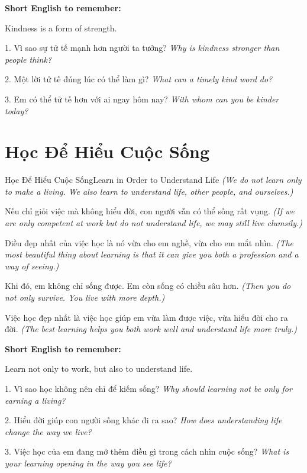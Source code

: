 \begin{ghinhoanh}
\textbf{Short English to remember:}

Kindness is a form of strength.

\end{ghinhoanh}

\begin{tuhocnhanh}
1. Vì sao sự tử tế mạnh hơn người ta tưởng? \textit{Why is kindness stronger than people think?}

2. Một lời tử tế đúng lúc có thể làm gì? \textit{What can a timely kind word do?}

3. Em có thể tử tế hơn với ai ngay hôm nay? \textit{With whom can you be kinder today?}
\end{tuhocnhanh}
\ngancach

\section{Học Để Hiểu Cuộc Sống}
\begin{truyen}{Học Để Hiểu Cuộc Sống}{Learn in Order to Understand Life}
\textit{(We do not learn only to make a living. We also learn to understand life, other people, and ourselves.)}

Nếu chỉ giỏi việc mà không hiểu đời, con người vẫn có thể sống rất vụng.
\textit{(If we are only competent at work but do not understand life, we may still live clumsily.)}

Điều đẹp nhất của việc học là nó vừa cho em nghề, vừa cho em mắt nhìn.
\textit{(The most beautiful thing about learning is that it can give you both a profession and a way of seeing.)}

Khi đó, em không chỉ sống được. Em còn sống có chiều sâu hơn.
\textit{(Then you do not only survive. You live with more depth.)}
\end{truyen}

\begin{baihoc}
Việc học đẹp nhất là việc học giúp em vừa làm được việc, vừa hiểu đời cho ra đời.
\textit{(The best learning helps you both work well and understand life more truly.)}
\end{baihoc}

\begin{ghinhoanh}
\textbf{Short English to remember:}

Learn not only to work, but also to understand life.

\end{ghinhoanh}

\begin{tuhocnhanh}
1. Vì sao học không nên chỉ để kiếm sống? \textit{Why should learning not be only for earning a living?}

2. Hiểu đời giúp con người sống khác đi ra sao? \textit{How does understanding life change the way we live?}

3. Việc học của em đang mở thêm điều gì trong cách nhìn cuộc sống? \textit{What is your learning opening in the way you see life?}
\end{tuhocnhanh}
\ngancach
